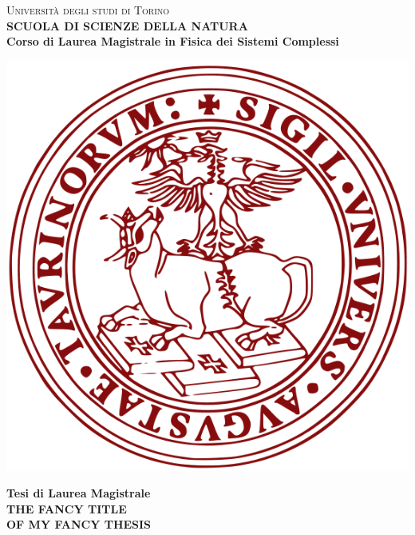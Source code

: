 \begin{titlepage}
\begin{center}
{{\Large{\textsc{Universit\`a degli studi di Torino \\}}}} \vspace{5mm} {\small{\bf SCUOLA DI SCIENZE DELLA NATURA\\ \vspace{3mm}
Corso di Laurea Magistrale in Fisica dei Sistemi Complessi}}
\vspace{5mm}
\end{center}
\begin{center}
\includegraphics[scale=.3]{head/logo.png}
\end{center}
\begin{center}
\vspace{5mm}
{\large{\bf Tesi di Laurea Magistrale\\}}
\vspace{5mm}
{\LARGE{\bf THE FANCY TITLE\\ OF MY FANCY THESIS\\}}
\end{center}
\vspace{20mm}
\vspace{11mm}

\end{titlepage}

